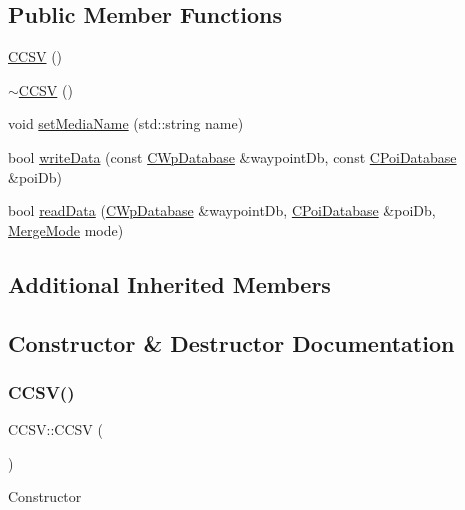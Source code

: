 \subsection*{Public Member Functions}
\begin{DoxyCompactItemize}
\item 
\hyperlink{classCCSV_af643bffe19b07da7ecad5c4a6cfd82c0}{C\+C\+SV} ()
\item 
\hyperlink{classCCSV_aa1a56cc8993767e5f0572b839c594bec}{$\sim$\+C\+C\+SV} ()
\item 
void \hyperlink{classCCSV_a473f20a4cb83f3f50174a194121138d1}{set\+Media\+Name} (std\+::string name)
\item 
bool \hyperlink{classCCSV_a9f0f855c4337078ab3ccff7a3a8148fa}{write\+Data} (const \hyperlink{classCWpDatabase}{C\+Wp\+Database} \&waypoint\+Db, const \hyperlink{classCPoiDatabase}{C\+Poi\+Database} \&poi\+Db)
\item 
bool \hyperlink{classCCSV_a861ad5d158b00a1eaef4d45710aa466c}{read\+Data} (\hyperlink{classCWpDatabase}{C\+Wp\+Database} \&waypoint\+Db, \hyperlink{classCPoiDatabase}{C\+Poi\+Database} \&poi\+Db, \hyperlink{classCPersistentStorage_a9b9929a4afa6e21da10f4a2e926a4584}{Merge\+Mode} mode)
\end{DoxyCompactItemize}
\subsection*{Additional Inherited Members}


\subsection{Constructor \& Destructor Documentation}
\mbox{\label{classCCSV_af643bffe19b07da7ecad5c4a6cfd82c0}} 
\subsubsection{\texorpdfstring{C\+C\+S\+V()}{CCSV()}}
{\footnotesize\ttfamily C\+C\+S\+V\+::\+C\+C\+SV (\begin{DoxyParamCaption}{ }\end{DoxyParamCaption})}

Constructor \mbox{\label{classCCSV_aa1a56cc8993767e5f0572b839c594bec}} 
